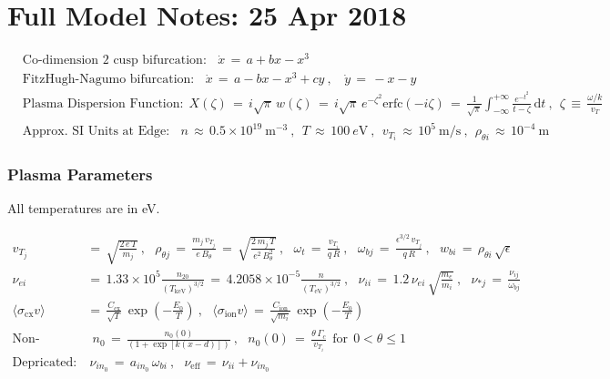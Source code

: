 \documentclass[a4paper,8pt]{article}
\date{}
\begin{document}
\section{Full Model Notes: 25 Apr
2018}\label{full-model-notes-25-apr-2018}

\small

\begin{align}
    &\text{Co-dimension 2 cusp bifurcation:} ~~~~ \dot{x} \,=\, a + bx - x^3 \\
    &\text{FitzHugh-Nagumo bifurcation:} ~~~~ \dot{x} \,=\, a - bx - x^3 + cy~,
        ~~~~ \dot{y} \,=\, -x - y \\
    &\text{Plasma Dispersion Function:} ~~ X(\zeta) \,=\, i \sqrt{\pi}\,w(\zeta)
        \,=\, i \sqrt{\pi} \, e^{-\zeta^2} \text{erfc}(-i \zeta)
        \,=\, \frac{1}{\sqrt{\pi}} \int_{-\infty}^{+\infty}
        \frac{e^{-t^2}}{t - \zeta} \, \text{d}t~,~~
        \zeta \,\equiv\, \frac{\omega/k}{v_T} \\
    &\text{Approx. SI Units at Edge:} ~~~~ n \,\approx\, 0.5\times 10^{19}~\text{m}^{-3}~,
        ~~ T \,\approx\, 100~e\text{V}~,~~ v_{T_i} \,\approx\, 10^5~\text{m}/\text{s}~,
        ~~ \rho_{\theta i} \,\approx\, 10^{-4}~\text{m}
\end{align}

\normalsize

\subsubsection{Plasma Parameters}\label{plasma-parameters}

All temperatures are in eV. \small

\begin{align}
    v_{T_j} \,&=\, \sqrt{\frac{2 \, e \, T}{m_j}}~,~~~
        \rho_{\theta j} \,=\, \frac{m_j \, v_{T_j}}{e \, B_\theta} \,=\,
            \sqrt{\frac{2 \, m_j \, T}{e^2 \, B_\theta^2}}~,~~~
        \omega_t \,=\, \frac{v_{T_i}}{q\,R}~,~~~
        \omega_{bj} \,=\, \frac{\epsilon^{3/2} \, v_{T_j}}{q \, R}~,~~~
        w_{bi} \,=\, \rho_{\theta i} \, \sqrt{\epsilon} \\
    \nu_{ei} \,&=\, 1.33\times 10^5 \frac{n_{20}}{(T_\text{keV})^{3/2}}
        \,=\, 4.2058\times 10^{-5} \frac{n}{(T_\text{eV})^{3/2}}~,~~~
        \nu_{ii} \,=\, 1.2\, \nu_{ei} \, \sqrt{\frac{m_e}{m_i}}~,~~~
        \nu_{*j} \,=\, \frac{\nu_{ij}}{\omega_{bj}} \\
    \langle \sigma_\text{cx} v \rangle \,&=\, \frac{C_\text{cx}}{\sqrt{T}} \,
        \exp\left(-\frac{E_0}{T}\right)~,~~~
        \langle \sigma_\text{ion} v \rangle \,=\, \frac{C_\text{ion}}{\sqrt{m_i}} \,
        \exp\left(-\frac{E_0}{T}\right) \\
    \text{Non-formal:}& ~~ n_0 \,=\, \frac{n_0(0)}
        {\left(1 + \exp\left[k(x - d)\right]\right)}~,~~~
        n_0(0) \,=\, \frac{\theta \, \Gamma_c}{v_{T_i}} ~~ \text{for} ~~
        0 < \theta \leq 1 \\
    \text{Depricated:}&~\nu_{in_0} \,=\, a_{in_0} \, \omega_{bi}~,~~~
        \nu_\text{eff} \,=\, \nu_{ii} + \nu_{in_0}
\end{align}
\end{document}
